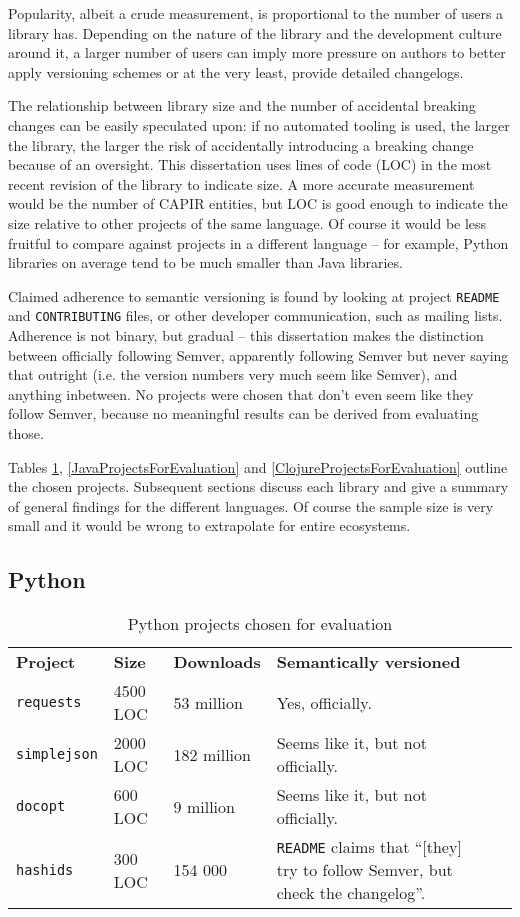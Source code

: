 \documentclass{l4proj}
\newcommand\genericstyle{\lstset{basicstyle=\ttm}}
\newcommand\codeinline[1]{{\genericstyle\lstinline!#1!}}
\begin{document}
Popularity, albeit a crude measurement, is proportional to the number
of users a library has. Depending on the nature of the library and the
development culture around it, a larger number of users can imply more
pressure on authors to better apply versioning schemes or at the very
least, provide detailed changelogs.

The relationship between library size and the number of accidental
breaking changes can be easily speculated upon: if no automated
tooling is used, the larger the library, the larger the risk of
accidentally introducing a breaking change because of an oversight.
This dissertation uses lines of code (LOC) in the most recent revision
of the library to indicate size. A more accurate measurement would be
the number of CAPIR entities, but LOC is good enough to indicate the
size relative to other projects of the same language. Of course it
would be less fruitful to compare against projects in a different
language -- for example, Python libraries on average tend to be much
smaller than Java libraries.

Claimed adherence to semantic versioning is found by looking at
project \codeinline{README} and \codeinline{CONTRIBUTING} files, or
other developer communication, such as mailing lists. Adherence is not
binary, but gradual -- this dissertation makes the distinction between
officially following Semver, apparently following Semver but never
saying that outright (i.e. the version numbers very much seem like
Semver), and anything inbetween. No projects were chosen that don't
even seem like they follow Semver, because no meaningful results can
be derived from evaluating those.

Tables \ref{PythonProjectsForEvaluation},
\ref{JavaProjectsForEvaluation} and \ref{ClojureProjectsForEvaluation}
outline the chosen projects. Subsequent sections discuss
each library and give a summary of general findings for the different
languages. Of course the sample size is very small and it would be
wrong to extrapolate for entire ecosystems.

\subsection{Python}

\begin{table}[H]
\label{PythonProjectsForEvaluation}
\centering
\begin{tabular}{|l|l|l||l|l|}
\textbf{Project} & \textbf{Size} & \textbf{Downloads} & \textbf{Semantically versioned} \\
\codeinline{requests} & 4500 LOC & 53 million & Yes, officially. \\
\codeinline{simplejson} & 2000 LOC & 182 million & Seems like it, but not officially. \\
\codeinline{docopt} & 600 LOC & 9 million & Seems like it, but not
officially. \\
\codeinline{hashids} & 300 LOC & 154 000 & \codeinline{README} claims
that ``[they] try to follow Semver, but check the changelog''.
\end{tabular}
\caption{Python projects chosen for evaluation}
\end{table}
\end{document}
